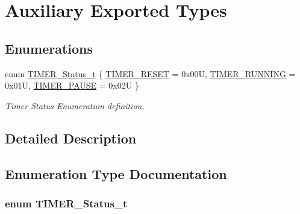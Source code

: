 \hypertarget{group___k_n_x___aux___exported___types}{}\section{Auxiliary Exported Types}
\label{group___k_n_x___aux___exported___types}
\subsection*{Enumerations}
\begin{DoxyCompactItemize}
\item 
enum \hyperlink{group___k_n_x___aux___exported___types_ga6ed3d972c6c5995cb3fe41995f121b41}{T\+I\+M\+E\+R\+\_\+\+Status\+\_\+t} \{ \hyperlink{group___k_n_x___aux___exported___types_gga6ed3d972c6c5995cb3fe41995f121b41a57568fa3e509d45656007614c72089ae}{T\+I\+M\+E\+R\+\_\+\+R\+E\+S\+ET} = 0x00U, 
\hyperlink{group___k_n_x___aux___exported___types_gga6ed3d972c6c5995cb3fe41995f121b41abc4495967cdeae935ea31fa8c3992139}{T\+I\+M\+E\+R\+\_\+\+R\+U\+N\+N\+I\+NG} = 0x01U, 
\hyperlink{group___k_n_x___aux___exported___types_gga6ed3d972c6c5995cb3fe41995f121b41a2fc9fdb3e346a94262fa0e143f8fcb79}{T\+I\+M\+E\+R\+\_\+\+P\+A\+U\+SE} = 0x02U
 \}\begin{DoxyCompactList}\small\item\em Timer Status Enumeration definition. \end{DoxyCompactList}
\end{DoxyCompactItemize}


\subsection{Detailed Description}


\subsection{Enumeration Type Documentation}
\subsubsection[{\texorpdfstring{T\+I\+M\+E\+R\+\_\+\+Status\+\_\+t}{TIMER_Status_t}}]{\setlength{\rightskip}{0pt plus 5cm}enum {\bf T\+I\+M\+E\+R\+\_\+\+Status\+\_\+t}}\hypertarget{group___k_n_x___aux___exported___types_ga6ed3d972c6c5995cb3fe41995f121b41}{}\label{group___k_n_x___aux___exported___types_ga6ed3d972c6c5995cb3fe41995f121b41}


